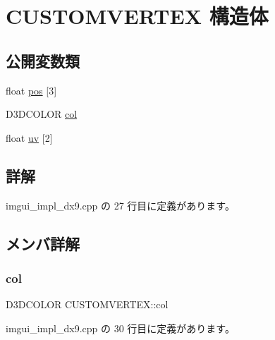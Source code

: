 \hypertarget{struct_c_u_s_t_o_m_v_e_r_t_e_x}{}\section{C\+U\+S\+T\+O\+M\+V\+E\+R\+T\+EX 構造体}
\label{struct_c_u_s_t_o_m_v_e_r_t_e_x}
\subsection*{公開変数類}
\begin{DoxyCompactItemize}
\item 
float \mbox{\hyperlink{struct_c_u_s_t_o_m_v_e_r_t_e_x_acbccf678628bfc243d77a99c1d7c7af3}{pos}} \mbox{[}3\mbox{]}
\item 
D3\+D\+C\+O\+L\+OR \mbox{\hyperlink{struct_c_u_s_t_o_m_v_e_r_t_e_x_a89194164a47349e936f21e10bb29f26a}{col}}
\item 
float \mbox{\hyperlink{struct_c_u_s_t_o_m_v_e_r_t_e_x_a2c27e901db37bc828fb408010596304c}{uv}} \mbox{[}2\mbox{]}
\end{DoxyCompactItemize}


\subsection{詳解}


 imgui\+\_\+impl\+\_\+dx9.\+cpp の 27 行目に定義があります。



\subsection{メンバ詳解}
\mbox{\label{struct_c_u_s_t_o_m_v_e_r_t_e_x_a89194164a47349e936f21e10bb29f26a}} 
\subsubsection{\texorpdfstring{col}{col}}
{\footnotesize\ttfamily D3\+D\+C\+O\+L\+OR C\+U\+S\+T\+O\+M\+V\+E\+R\+T\+E\+X\+::col}



 imgui\+\_\+impl\+\_\+dx9.\+cpp の 30 行目に定義があります。

\mbox{\label{struct_c_u_s_t_o_m_v_e_r_t_e_x_acbccf678628bfc243d77a99c1d7c7af3}} 
